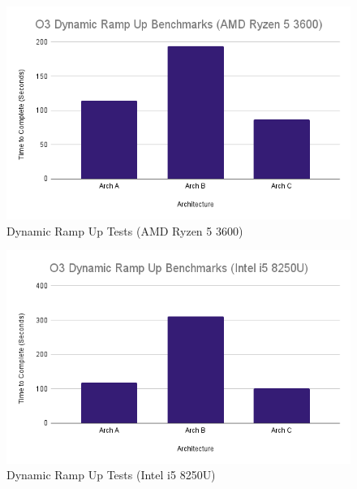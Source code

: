 \documentclass{article}
\begin{document}
\begin{figure}[!h]
\centering
\includegraphics[scale=0.5]{O3 Dynamic Ramp Up Benchmarks (AMD Ryzen 5 3600).png}
\caption{Dynamic Ramp Up Tests (AMD Ryzen 5 3600)}
\label{pc_dynamic_ramp_up_tests}
\end{figure}

\begin{figure}[!h]
\centering
\includegraphics[scale=0.5]{O3 Dynamic Ramp Up Benchmarks (Intel i5 8250U).png}
\caption{Dynamic Ramp Up Tests (Intel i5 8250U)}
\label{laptop_dynamic_ramp_up_tests}
\end{figure}

\clearpage
\end{document}
